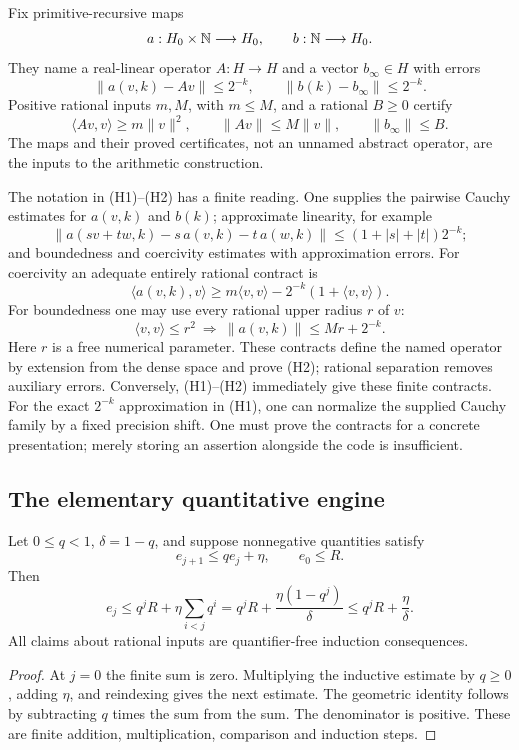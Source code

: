 \begin{definition}
\label{def:strong-operator}
Fix primitive-recursive maps
\[
 a:H_0\times\mathbb N\longrightarrow H_0,\qquad b:\mathbb N\longrightarrow H_0.
\]
They name a real-linear operator \(A:H\to H\) and a vector \(b_\infty\in H\)
with errors
\[
 \|a(v,k)-Av\|\leq2^{-k},\qquad
 \|b(k)-b_\infty\|\leq2^{-k}.
 \tag{H1}
\]
Positive rational inputs \(m,M\), with \(m\leq M\), and a rational \(B\geq0\)
certify
\[
 \langle Av,v\rangle\geq m\|v\|^2,\qquad
 \|Av\|\leq M\|v\|,\qquad \|b_\infty\|\leq B.
 \tag{H2}
\]
The maps and their proved certificates, not an unnamed abstract operator, are
the inputs to the arithmetic construction.
\end{definition}

The notation in (H1)--(H2) has a finite reading. One supplies the pairwise
Cauchy estimates for \(a(v,k)\) and \(b(k)\); approximate linearity, for example
\[
\|a(sv+tw,k)-s\,a(v,k)-t\,a(w,k)\|
       \leq(1+|s|+|t|)2^{-k};
\]
and boundedness and coercivity estimates with approximation errors.
For coercivity an adequate entirely rational contract is
\[
\langle a(v,k),v\rangle
 \geq m\langle v,v\rangle-2^{-k}(1+\langle v,v\rangle).
\]
For boundedness one may use every rational upper radius \(r\) of \(v\):
\[
\langle v,v\rangle\leq r^2
 \ \Longrightarrow\ \|a(v,k)\|\leq Mr+2^{-k}.
\]
Here \(r\) is a free numerical parameter. These contracts define the named
operator by extension from the dense space and prove (H2); rational
separation removes auxiliary errors. Conversely, (H1)--(H2) immediately
give these finite contracts. For the exact \(2^{-k}\) approximation in (H1),
one can normalize the supplied Cauchy family by a fixed precision shift.
One must prove the contracts for a concrete presentation; merely storing an
assertion alongside the code is insufficient.

\subsection{The elementary quantitative engine}

\begin{lemma}
\label{lem:perturb}
Let \(0\leq q<1\), \(\delta=1-q\), and suppose nonnegative quantities satisfy
\[
             e_{j+1}\leq q e_j+\eta,\qquad e_0\leq R .
\]
Then
\[
 e_j\leq q^jR+\eta\sum_{i<j}q^i
       =q^jR+\frac{\eta(1-q^j)}{\delta}
       \leq q^jR+\frac{\eta}{\delta}.
 \tag{H3}
\]
All claims about rational inputs are quantifier-free induction consequences.
\end{lemma}
\begin{proof}
At \(j=0\) the finite sum is zero. Multiplying the inductive estimate by
\(q\geq0\), adding \(\eta\), and reindexing gives the next
estimate. The geometric identity follows by subtracting \(q\) times the
sum from the sum. The denominator is positive. These are finite addition,
multiplication, comparison and induction steps.
\end{proof}


